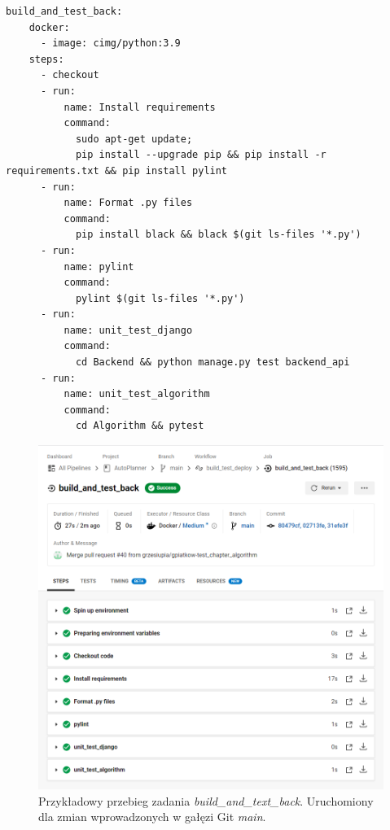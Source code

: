 	
\begin{lstlisting}[caption=Część skryptu config.yml odpowiadająca za wykonanie zadania \textit{build\_and\_test\_back},label={lst:test_back}]
build_and_test_back:
    docker:
      - image: cimg/python:3.9
    steps:
      - checkout
      - run:
          name: Install requirements
          command:
            sudo apt-get update;
            pip install --upgrade pip && pip install -r requirements.txt && pip install pylint
      - run:
          name: Format .py files
          command:
            pip install black && black $(git ls-files '*.py')
      - run:
          name: pylint
          command:
            pylint $(git ls-files '*.py')
      - run:
          name: unit_test_django
          command:
            cd Backend && python manage.py test backend_api
      - run:
          name: unit_test_algorithm
          command:
            cd Algorithm && pytest
\end{lstlisting} 
\begin{figure}[H]
\centering\includegraphics[width=14cm]{figures/circleci_test_back}
\caption{Przykładowy przebieg zadania \textit{build\_and\_text\_back}. Uruchomiony dla zmian wprowadzonych w gałęzi Git \textit{main}.}\label{rys:test_back}
\end{figure} 


